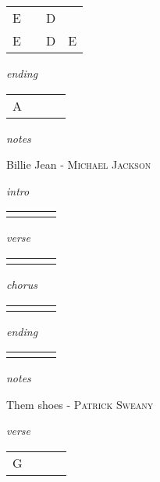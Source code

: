 \documentclass[12pt]{article}
\begin{document}
\begin{tabular}{|P{1.25in}|P{1.25in}|P{1.25in}|P{1.25in}|}
  E &   & D &   \\
  E &   & D & E \\
\end{tabular}

\textit{ending}

\begin{tabular}{|P{1.25in}|P{1.25in}|P{1.25in}|P{1.25in}|}
  A &   &   &   \\
\end{tabular}

\textit{notes}

\newpage

{\Huge Billie Jean} {\huge - \textsc{Michael Jackson}}

\huge
\textit{intro}

\begin{tabular}{|P{1.25in}|P{1.25in}|P{1.25in}|P{1.25in}|}
   &   &   &   \\
\end{tabular}

\textit{verse}

\begin{tabular}{|P{1.25in}|P{1.25in}|P{1.25in}|P{1.25in}|}
    &   &   &   \\
\end{tabular}

\textit{chorus}

\begin{tabular}{|P{1.25in}|P{1.25in}|P{1.25in}|P{1.25in}|}
    &   &   &   \\
\end{tabular}

\textit{ending}

\begin{tabular}{|P{1.25in}|P{1.25in}|P{1.25in}|P{1.25in}|}
    &   &   &   \\
\end{tabular}

\textit{notes}

\newpage

{\Huge Them shoes} {\huge - \textsc{Patrick Sweany}}

\huge
\textit{verse}

\begin{tabular}{|P{1.25in}|P{1.25in}|P{1.25in}|P{1.25in}|}
  G  &   &   &   \\
\end{tabular}
\end{document}
